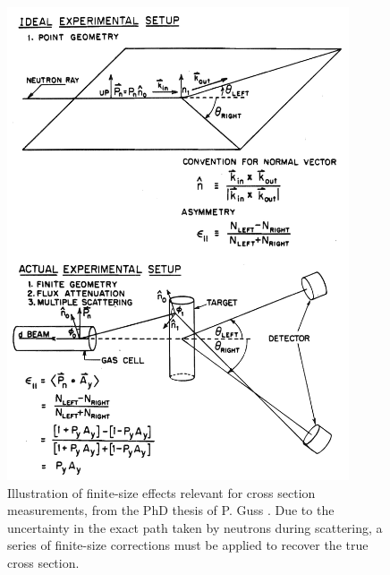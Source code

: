 \begin{figure}[ht!]
    \begin{center}
        \includegraphics[width = 0.9\textwidth]{figures/GussFiniteSizeDiagram.png}
        \caption[Illustration of finite-size effects relevant for \el cross
        section measurements]
        {
            Illustration of finite-size effects relevant for \el cross
            section measurements, from the PhD thesis of P. Guss
            \cite{GussPhDThesis}. Due to the uncertainty in the exact path taken
            by neutrons during scattering, a series of finite-size corrections
            must be applied to recover the true cross section.
        }
        \label{GussFiniteSizeDiagram}
    \end{center}
\end{figure}

